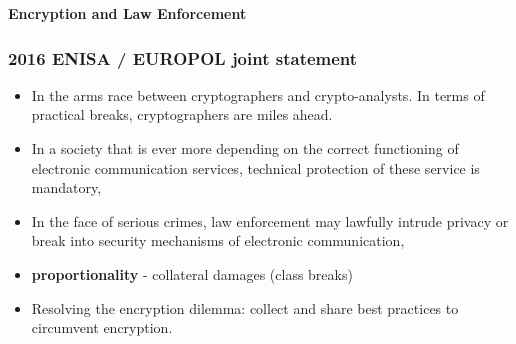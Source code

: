 \documentclass{beamer}
\begin{document}
\begin{frame}
  \begin{center}
    {\bf Encryption and Law Enforcement}
  \end{center}
\end{frame}

\begin{frame}
        \frametitle{2016 ENISA / EUROPOL joint statement}
        \begin{itemize}
          \item In the arms race between cryptographers and crypto-analysts. In
            terms of practical breaks, cryptographers are miles ahead.
          \item In a society that is ever more depending on the correct
            functioning of electronic communication services, technical
            protection of these service is mandatory,
          \item In the face of serious crimes, law enforcement may lawfully
            intrude privacy or break into security mechanisms of electronic communication,
          \item {\bf proportionality} - collateral damages (class breaks)
          \item Resolving the encryption dilemma: collect and share best
            practices to circumvent encryption.
        \end{itemize}
\end{frame}
\end{document}
